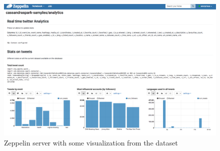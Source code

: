 \begin{figure}
\centering
\includegraphics[width=\textwidth]{Figures/zeppelin}
\decoRule
\caption[Zeppelin visualization example]{Zeppelin server with some visualization from the dataset}
\label{fig:zeppelin}
\end{figure}

